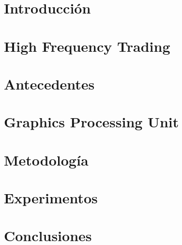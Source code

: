 \documentclass[spanish,12pt,letterpaper,oneside]{book}
\begin{document}
    

    \begin{spacing}{.97}
        \newpage
        

        \newpage
        
        

        \pagestyle{fancy} 
        \chapter{Introducción}
        \label{ch:introduction}
        

        \chapter{High Frequency Trading}
        \label{ch:hft}
        

        \chapter{Antecedentes}
        \label{ch:backgound}
        

        \chapter{Graphics Processing Unit}
        \label{ch:gpu}
        
     
        \chapter{Metodología}
        \label{ch:implementacion}
        

        \chapter{Experimentos}
        \label{ch:experimentos}
        

        \chapter{Conclusiones}
        \label{ch:conclusiones}
        

        
        
        \nocite{*}
    \end{spacing}
\end{document}
